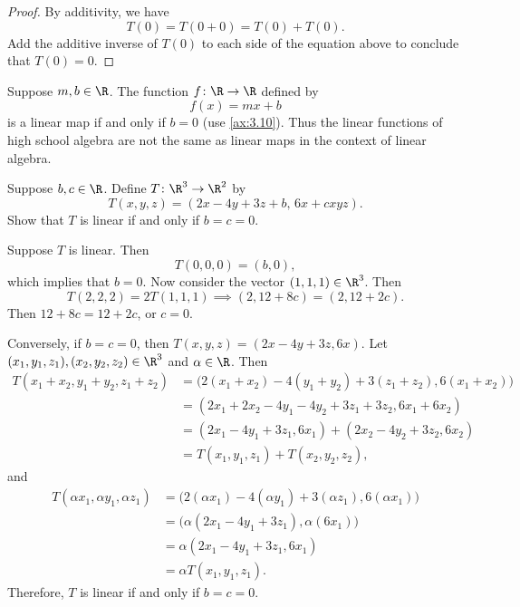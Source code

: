 \begin{proof}
By additivity, we have
\[ T(0)=T(0+0)=T(0)+T(0). \]
Add the additive inverse of $T(0)$ to each side of the equation above to
conclude that $T(0)=0$.
\end{proof}

Suppose $m,b\in\R$. The function $f\colon\R\to\R$ defined by
\[ f(x)=mx+b \]
is a linear map if and only if $b=0$ (use \ref{ax:3.10}). Thus the linear
functions of high school algebra are not the same as linear maps in the
context of linear algebra.

\begin{exc}

\begin{exercise}
Suppose $b,c\in\R$. Define $T\colon\R^3\to\R^2$ by
\[ T(x,y,z)=(2x-4y+3z+b,\,6x+cxyz). \]
Show that $T$ is linear if and only if $b=c=0$.
\end{exercise}
\begin{solution}
Suppose $T$ is linear. Then
\[ T(0,0,0)=(b,0), \]
which implies that $b=0$. Now consider the vector $(1,1,1)\in\R^3$. Then
\[ T(2,2,2)=2T(1,1,1)\implies(2,12+8c)=(2,12+2c). \]
Then $12+8c=12+2c$, or $c=0$.

Conversely, if $b=c=0$, then $T(x,y,z)=(2x-4y+3z,6x)$. Let
$(x_1,y_1,z_1),\allowbreak(x_2,y_2,z_2)\in\R^3$ and $\alpha\in\R$. Then
\begin{align*}
T(x_1+x_2,y_1+y_2,z_1+z_2)
  &= \bigl(2(x_1+x_2)-4(y_1+y_2)+3(z_1+z_2),6(x_1+x_2)\bigr)\\
  &= (2x_1+2x_2-4y_1-4y_2+3z_1+3z_2,6x_1+6x_2)\\
  &= (2x_1-4y_1+3z_1,6x_1)+(2x_2-4y_2+3z_2,6x_2)\\
  &= T(x_1,y_1,z_1)+T(x_2,y_2,z_2),
\end{align*}
and
\begin{align*}
T(\alpha x_1,\alpha y_1,\alpha z_1)
  &= \bigl(2(\alpha x_1)-4(\alpha y_1)+3(\alpha z_1),6(\alpha x_1)\bigr)\\
  &= \bigl(\alpha(2x_1-4y_1+3z_1),\alpha(6x_1)\bigr)\\
  &= \alpha(2x_1-4y_1+3z_1,6x_1)\\
  &= \alpha T(x_1,y_1,z_1).
\end{align*}
Therefore, $T$ is linear if and only if $b=c=0$.
\end{solution}


\end{exc}
